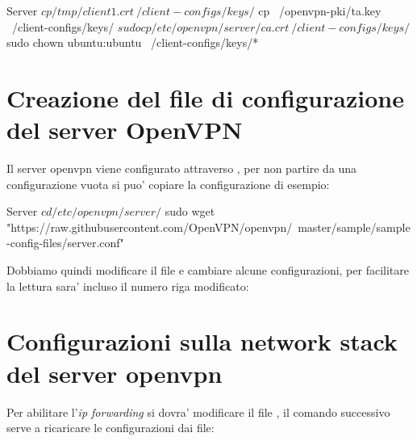 \begin{bashcode}{Server}{}
$ cp /tmp/client1.crt ~/client-configs/keys/
$ cp ~/openvpn-pki/ta.key ~/client-configs/keys/
$ sudo cp /etc/openvpn/server/ca.crt ~/client-configs/keys/
$ sudo chown ubuntu:ubuntu ~/client-configs/keys/*
\end{bashcode}


\section{Creazione del file di configurazione del server OpenVPN}
\label{sec:server_config}

Il server openvpn viene configurato attraverso , per non partire da una configurazione vuota si puo' copiare la configurazione di esempio:

\begin{bashcode}{Server}{}
$ cd /etc/openvpn/server/
$ sudo wget "https://raw.githubusercontent.com/OpenVPN/openvpn/\
                master/sample/sample-config-files/server.conf"
\end{bashcode}

Dobbiamo quindi modificare il file e cambiare alcune configurazioni, per facilitare la lettura sara' incluso il numero riga modificato:



\section{Configurazioni sulla network stack del server openvpn}
\label{sec:network_stack}

Per abilitare l'\textit{ip forwarding} si dovra' modificare il file , il comando successivo serve a ricaricare le configurazioni dai file:

